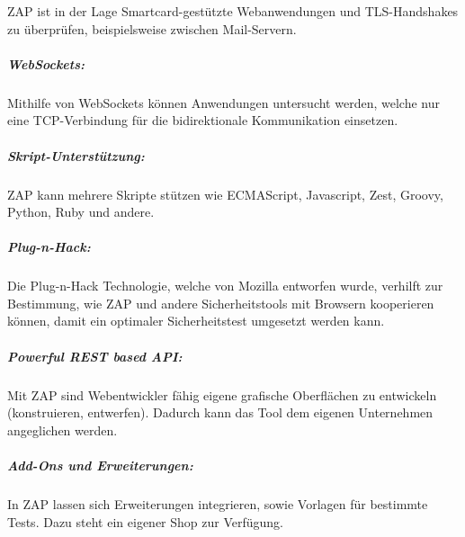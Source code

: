 ZAP ist in der Lage Smartcard-gestützte Webanwendungen und TLS-Handshakes zu überprüfen, beispielsweise zwischen Mail-Servern.

\subparagraph{WebSockets:}

Mithilfe von WebSockets können Anwendungen untersucht werden, welche nur eine TCP-Verbindung für die bidirektionale Kommunikation einsetzen. 

\subparagraph{Skript-Unterstützung:}

ZAP kann mehrere Skripte stützen wie ECMAScript, Javascript, Zest, Groovy,  Python, Ruby und andere. 

\subparagraph{Plug-n-Hack:}

Die Plug-n-Hack Technologie, welche von Mozilla entworfen wurde, verhilft zur Bestimmung, wie ZAP und andere Sicherheitstools mit Browsern kooperieren können, damit ein optimaler Sicherheitstest umgesetzt werden kann. 

\subparagraph{Powerful REST based API:}

Mit ZAP sind Webentwickler fähig eigene grafische Oberflächen zu entwickeln (konstruieren, entwerfen). Dadurch kann das Tool dem eigenen Unternehmen angeglichen werden. 

\subparagraph{Add-Ons und Erweiterungen:}

In ZAP lassen sich Erweiterungen integrieren, sowie Vorlagen für bestimmte Tests. Dazu steht ein eigener Shop zur Verfügung.

\newpage\null\thispagestyle{empty}\newpage